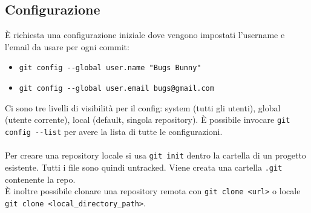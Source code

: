 \documentclass[10pt, a4paper]{article}
\begin{document}
\subsection{Configurazione}
È richiesta una configurazione iniziale dove vengono impostati l’username e l’email da usare per ogni commit:
\begin{itemize}
    \item \verb|git config --global user.name "Bugs Bunny"|
    \item \verb|git config --global user.email bugs@gmail.com|
\end{itemize}
Ci sono tre livelli di visibilità per il config: system (tutti gli utenti), global (utente corrente), local (default, singola repository).
È possibile invocare \verb|git config --list| per avere la lista di tutte le configurazioni.\\\\
Per creare una repository locale si usa \verb|git init| dentro la cartella di un progetto esistente. Tutti i file sono quindi untracked. Viene creata una cartella \verb|.git| contenente la repo.\\
È inoltre possibile clonare una repository remota con \verb|git clone <url>| o locale \verb|git clone <local_directory_path>|.
\end{document}
